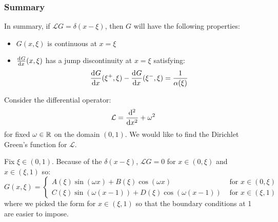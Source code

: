 \documentclass[../main.tex]{subfiles}
\begin{document}
\subsubsection{Summary} \label{GProps}
In summary, if $\mathcal{L}G = \delta(x - \xi)$, then $G$ will have the following properties:
\begin{itemize}
  \item $G(x, \xi)$ is continuous at $x = \xi$
  \item $\deriv{G}{x}(x, \xi)$ has a jump discontinuity at $x = \xi$ satisfying:
    \[
      \deriv{G}{x}(\xi^{+}, \xi) - \deriv{G}{x}(\xi^{-}, \xi) = \frac{1}{\alpha(\xi)}
    \]
\end{itemize}
\begin{example} \label{greenExample}
  Consider the differential operator:
  \[
    \mathcal{L} = \deriv[2]{}{x} + \omega^2
  \]
  for fixed $\omega \in \mathbb{R}$ on the domain $(0, 1)$.
  We would like to find the Dirichlet Green's function for $\mathcal{L}$.

  Fix $\xi \in (0, 1)$.
  Because of the $\delta(x - \xi)$, $\mathcal{L}G = 0$ for $x \in (0, \xi)$ and $x \in (\xi, 1)$ so:
  \[
    G(x, \xi) = \begin{cases}
    A(\xi)\sin(\omega x) + B(\xi)\cos(\omega x) & \text{ for } x \in (0, \xi) \\
    C(\xi)\sin(\omega(x - 1)) + D(\xi)\cos(\omega(x - 1)) & \text{ for } x \in (\xi, 1)
    \end{cases}
  \]
  where we picked the form for $x \in (\xi, 1)$ so that the boundary conditions at 1 are easier to impose.


\end{example}
\end{document}

